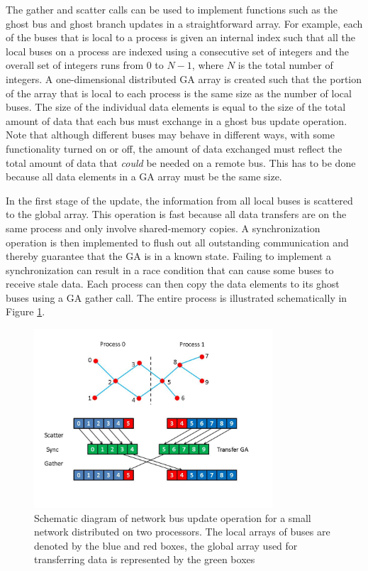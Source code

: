 \documentclass[preprint]{acm_proc_article-sp}
\begin{document}
The gather and scatter calls can be used to implement functions such as the ghost
bus and ghost branch updates in a straightforward array. For example, each of
the buses that is local to a process is given an internal index such that all
the local buses on a process are indexed using a consecutive set of integers and
the overall set of integers runs from 0 to $N-1$, where $N$ is the total number
of integers. A one-dimensional distributed GA array is created such that the
portion of the array that is local to each process is the same size as the
number of local buses. The size of the individual data elements is equal to the
size of the total amount of data that each bus must exchange in a ghost bus update
operation. Note that although different buses may behave in different ways, with
some functionality turned on or off, the amount of data exchanged must reflect
the total amount of data that {\em could} be needed on a remote bus. This has to
be done because all data elements in a GA array must be the same size.

In the first stage of the update, the information from all local buses is
scattered to the global array. This operation is fast because all data transfers
are on the same process and only involve shared-memory copies. A synchronization
operation is then implemented to flush out all outstanding communication
and thereby guarantee that the GA is in a known state. Failing to implement a
synchronization can result in a race condition that can cause some buses to
receive stale data. Each process can then copy the
data elements to its ghost buses using a GA gather call. The entire process is
illustrated schematically in Figure \ref{update}.
\begin{figure}
\centering
\includegraphics[width=3.5in,keepaspectratio=true]{./FigU}
\caption{\label{update} Schematic diagram of network bus update operation for a
small network distributed on two processors. The local arrays of buses are
denoted by the blue and red boxes, the global array used for transferring data
is represented by the green boxes
}
\end{figure}
\end{document}
